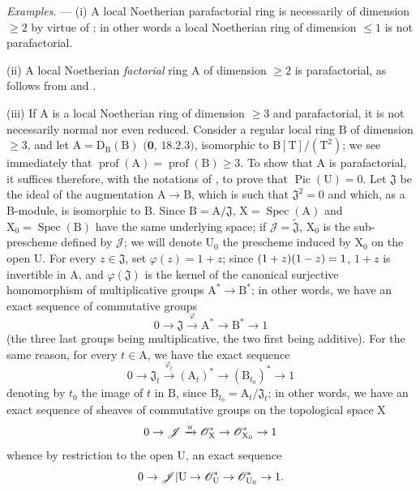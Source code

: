 \begin{env}[21.13.9]
\label{IV.21.13.9}
\emph{Examples}. ---
(i)
A local Noetherian parafactorial ring is necessarily of dimension $\geq 2$ by virtue of ; in other words a local Noetherian ring of dimension $\leq 1$ is not parafactorial.

(ii)
A local Noetherian \emph{factorial} ring $\mathrm{A}$ of dimension $\geq 2$ is parafactorial, as follows from  and .

(iii)
If $\mathrm{A}$ is a local Noetherian ring of dimension $\geq 3$ and parafactorial, it is not necessarily normal nor even reduced.
Consider a regular local ring $\mathrm{B}$ of dimension $\geq 3$, and let $\mathrm{A}=\mathrm{D}_{\mathrm{B}}(\mathrm{B})$ $(\mathbf{0}$, $18.2.3)$, isomorphic to $\mathrm{B}[\mathrm{T}]/(\mathrm{T}^2)$; we see immediately that $\operatorname{prof}(\mathrm{A})=\operatorname{prof}(\mathrm{B})\geq 3$.
To show that $\mathrm{A}$ is parafactorial, it suffices therefore, with the notations of , to prove that $\operatorname{Pic}(\mathrm{U})=0$.
Let $\mathfrak{J}$ be the ideal of the augmentation $\mathrm{A}\to\mathrm{B}$, which is such that $\mathfrak{J}^2=0$ and which, as a $\mathrm{B}$-module, is isomorphic to $\mathrm{B}$.
Since $\mathrm{B}=\mathrm{A}/\mathfrak{J}$, $\mathrm{X}=\operatorname{Spec}(\mathrm{A})$ and $\mathrm{X}_0=\operatorname{Spec}(\mathrm{B})$ have the same underlying space; if $\mathscr{J}=\widetilde{\mathfrak{J}}$, $\mathrm{X}_0$ is the sub-prescheme defined by $\mathscr{J}$; we will denote $\mathrm{U}_0$ the prescheme induced by $\mathrm{X}_0$ on the open $\mathrm{U}$.
For every $z\in\mathfrak{J}$, set $\varphi(z)=1+z$; since $(1+z)(1- z)=1$, $1+z$ is invertible in $\mathrm{A}$, and $\varphi(\mathfrak{J})$ is the kernel of the canonical surjective homomorphism of multiplicative groups $\mathrm{A}^*\to\mathrm{B}^*$; in other words, we have an exact sequence of commutative groups
\[
  0\to\mathfrak{J}\xrightarrow{\varphi}\mathrm{A}^*\to\mathrm{B}^*\to 1
\]
(the three last groups being multiplicative, the two first being additive).
For the same reason, for every $t\in\mathrm{A}$, we have the exact sequence
\[
  0\to\mathfrak{J}_t\xrightarrow{\varphi_t}(\mathrm{A}_t)^*\to(\mathrm{B}_{t_0})^*\to 1
\]
denoting by $t_0$ the image of $t$ in $\mathrm{B}$, since $\mathrm{B}_{t_0}=\mathrm{A}_t/\mathfrak{J}_t$; in other words, we have an exact sequence of sheaves of commutative groups on the topological space $\mathrm{X}$
\[
  0\to\mathscr{J}\xrightarrow{u}\mathscr{O}_{\mathrm{X}}^*\to\mathscr{O}_{\mathrm{X}_0}^*\to 1
\]
whence by restriction to the open $\mathrm{U}$, an exact sequence
\[
  0\to\mathscr{J}|\mathrm{U}\to\mathscr{O}_{\mathrm{U}}^*\to\mathscr{O}_{\mathrm{U}_0}^*\to 1.
\]


\end{env}
